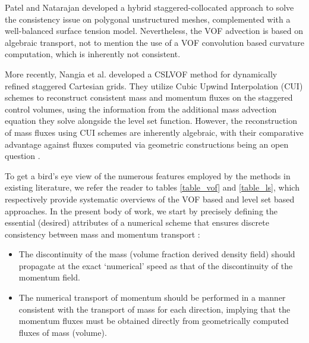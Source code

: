 Patel and Natarajan  developed a hybrid 
staggered-collocated approach to solve the consistency issue on 
polygonal unstructured meshes, complemented with a well-balanced surface tension model. 
Nevertheless, the VOF advection is based on algebraic transport, 
not to mention the use of a VOF convolution based 
curvature computation, which is inherently not consistent. 


More recently, Nangia et al.  developed a 
CSLVOF method for dynamically refined staggered Cartesian grids. 
They utilize Cubic Upwind Interpolation (CUI) schemes to 
reconstruct consistent mass and momentum fluxes on the staggered 
control volumes, using the information from the additional mass 
advection equation they solve alongside the level set function.   
However, the reconstruction of mass fluxes using CUI schemes are 
inherently algebraic, with their comparative advantage against fluxes 
computed via geometric constructions being an open question 
.

To get a bird's eye view of the numerous features employed by the methods 
in existing literature, we refer the reader to tables \ref{table_vof} and \ref{table_ls}, 
which respectively provide systematic overviews of the VOF based and level set based approaches.    
In the present body of work, we start by precisely defining the
essential (desired) attributes of a numerical scheme that 
ensures discrete consistency between mass and momentum transport : 

\begin{itemize}
	\item The discontinuity of the mass (volume fraction 
		derived density field) should propagate at the 
		exact `numerical' speed as that of 
		the discontinuity of the momentum field. 
	\item The numerical transport of momentum should be performed 
		in a manner consistent with the transport of mass for 
		each direction, implying that the momentum fluxes must 
		be obtained directly from geometrically 
		computed fluxes of mass (volume). 
\end{itemize}

